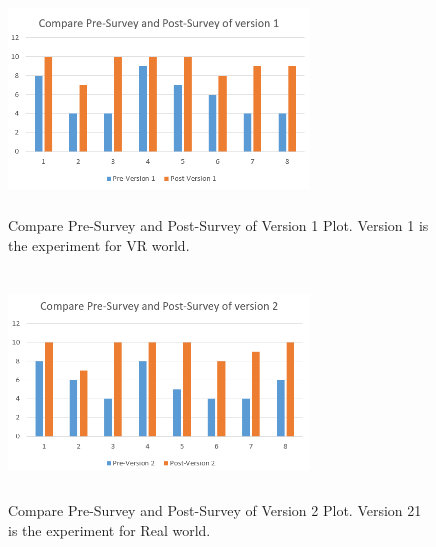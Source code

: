 \documentclass{vgtc}                          %
\begin{document}
\begin{enumerate}
    \begin{figure}[H]
 \centering
 \includegraphics[width=8cm, height=6cm]{pictures/Compare Version 1.png}
 \caption{Compare Pre-Survey and Post-Survey of Version 1 Plot. Version 1 is the experiment for VR world.}
 \label{fig:compare version1}
\end{figure}

\begin{figure}[H]
 \centering
 \includegraphics[width=8cm, height=6cm]{pictures/Compare Version 2.png}
 \caption{Compare Pre-Survey and Post-Survey of Version 2 Plot. Version 21 is the experiment for Real world.}
 \label{fig:computer version2}
\end{figure}
\end{enumerate}
\end{document}
